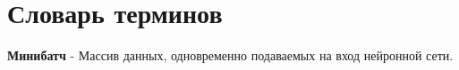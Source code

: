 \chapter*{Словарь терминов}             %

\textbf{Минибатч} - Массив данных, одновременно подаваемых на вход нейронной сети. 

